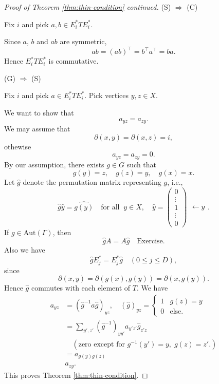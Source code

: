 \documentclass[
]{book}
\theoremstyle{definition}
\theoremstyle{definition}
\theoremstyle{definition}
\theoremstyle{definition}
\theoremstyle{remark}
\begin{document}
\begin{proof}[Proof of Theorem \ref{thm:thin-condition} continued]
\leavevmode

(S) \(\Rightarrow\) (C)

Fix \(i\) and pick \(a, b\in E_i^*TE_i^*\).

Since \(a\), \(b\) and \(ab\) are symmetric,
\[ab = (ab)^\top = b^\top a^\top = ba.\]
Hence \(E_i^*TE_i^*\) is commutative.

(G) \(\Rightarrow\) (S)

Fix \(i\) and pick \(a \in E_i^*TE_i^*\). Pick vertices \(y, z\in X\).

We want to show that
\[a_{yz} = a_{zy}.\]
We may assume that
\[\partial(x, y) = \partial(x,z) = i,\]
othewise
\[a_{yz} = a_{zy} = 0.\]
By our assumption, there exists \(g\in G\) such that
\[g(y) = z, \quad g(z) = y, \quad g(x) = x.\]
Let \(\hat{g}\) denote the permutation matrix representing \(g\), i.e.,
\[\hat{g}\hat{y} =\widehat{g(y)} \quad \text{for all }\ y\in X, \quad \hat{y} = \begin{pmatrix}0\\\vdots \\ 1 \\\vdots \\0\end{pmatrix}\begin{matrix} \\ \\ \leftarrow y \\ \\ \text{ } \end{matrix}.\]
If \(g\in \mathrm{Aut}(\Gamma)\), then
\[\hat{g}A = A\hat{g} \quad \text{Exercise}.\]
Also we have
\[\hat{g}E_j^* = E^*_j\hat{g} \quad (0\leq j\leq D),\]
since
\[\partial(x,y) = \partial(g(x), g(y)) = \partial(x, g(y)).\]
Hence \(\hat{g}\) commutes with each element of \(T\). We have
\begin{align}
a_{yz} & = (\hat{g}^{-1}a\hat{g})_{yz}, \quad (\hat{g})_{yz} = \begin{cases} 1 & g(z) = y\\ 0 & \text{else.}\end{cases}\\
& = \sum_{y', z'}(\hat{g}^{-1})_{yy'}a_{y'z'}\hat{g}_{z'z}\\
& \quad (\text{zero except for $g^{-1}(y') = y, \; g(z) = z'$}.)\\
& = a_{g(y)g(z)}\\
& a_{zy}.
\end{align}
This proves Theorem \ref{thm:thin-condition}.

\end{proof}
\end{document}
